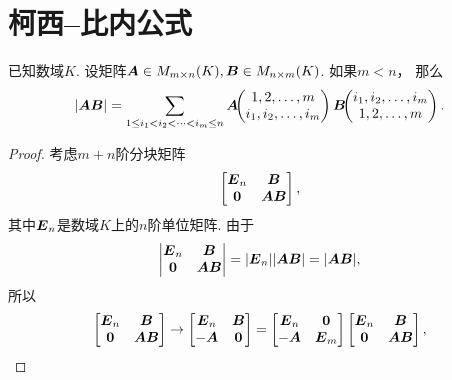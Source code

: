 \section{柯西--比内公式}
\begin{theorem}
已知数域\(K\).
设矩阵\(\boldsymbol{A} \in M_{m \times n}(K),
\boldsymbol{B} \in M_{n \times m}(K)\).
如果\(m < n\)，
那么\begin{equation}\label{equation:线性方程组.柯西比内公式}
	\abs{\boldsymbol{A}\boldsymbol{B}}
	= \sum_{1 \leq i_1 < i_2 < \dotsb < i_m \leq n}
	\boldsymbol{A}\kern-3.8pt\begin{pmatrix}
		1,2,\dotsc,m \\
		i_1,i_2,\dotsc,i_m
	\end{pmatrix}
	\boldsymbol{B}\kern-3.8pt\begin{pmatrix}
		i_1,i_2,\dotsc,i_m \\
		1,2,\dotsc,m
	\end{pmatrix}.
\end{equation}
\begin{proof}
考虑\(m+n\)阶分块矩阵\begin{equation*}
	\begin{bmatrix}
		\boldsymbol{E}_n & \boldsymbol{B} \\
		\boldsymbol0 & \boldsymbol{A}\boldsymbol{B}
	\end{bmatrix},
\end{equation*}
其中\(\boldsymbol{E}_n\)是数域\(K\)上的\(n\)阶单位矩阵.
由于\begin{equation*}
	\begin{vmatrix}
		\boldsymbol{E}_n & \boldsymbol{B} \\
		\boldsymbol0 & \boldsymbol{A}\boldsymbol{B}
	\end{vmatrix}
	= \abs{\boldsymbol{E}_n} \abs{\boldsymbol{A}\boldsymbol{B}}
	= \abs{\boldsymbol{A}\boldsymbol{B}},
\end{equation*}
所以\begin{equation*}
	\begin{bmatrix}
		\boldsymbol{E}_n & \boldsymbol{B} \\
		\boldsymbol0 & \boldsymbol{A}\boldsymbol{B}
	\end{bmatrix}
	\to
	\begin{bmatrix}
		\boldsymbol{E}_n & \boldsymbol{B} \\
		-\boldsymbol{A} & \boldsymbol0
	\end{bmatrix}
	= \begin{bmatrix}
		\boldsymbol{E}_n & \boldsymbol0 \\
		-\boldsymbol{A} & \boldsymbol{E}_m
	\end{bmatrix} \begin{bmatrix}
		\boldsymbol{E}_n & \boldsymbol{B} \\
		\boldsymbol0 & \boldsymbol{A}\boldsymbol{B}
	\end{bmatrix},
\end{equation*}\begin{equation*}

\end{equation*}
\end{proof}
\end{theorem}
